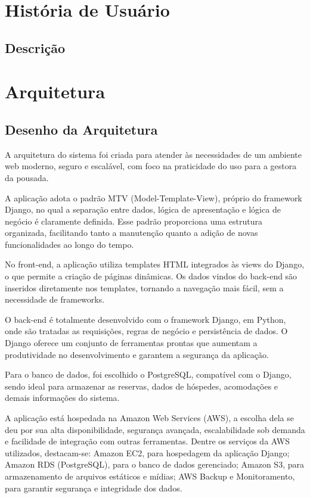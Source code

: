\documentclass[
	12pt,				%
	openany,			%
	twoside,			%
	a4paper,			%
	english,			%
	french,				%
	spanish,			%
	brazil				%
	]{abntex2}
\begin{document}
\section{História de Usuário}
\subsection{Descrição}

\section{Arquitetura}
\subsection{Desenho da Arquitetura}
A arquitetura do sistema foi criada para atender às necessidades de um ambiente web moderno, seguro e escalável, com foco na praticidade do uso para a gestora da pousada.

A aplicação adota o padrão MTV (Model-Template-View), próprio do framework Django, no qual a separação entre dados, lógica de apresentação e lógica de negócio é claramente definida. Esse padrão proporciona uma estrutura organizada, facilitando tanto a manutenção quanto a adição de novas funcionalidades ao longo do tempo.

No front-end, a aplicação utiliza templates HTML integrados às views do Django, o que permite a criação de páginas dinâmicas. Os dados vindos do back-end são inseridos diretamente nos templates, tornando a navegação mais fácil, sem a necessidade de frameworks.

O back-end é totalmente desenvolvido com o framework Django, em Python, onde são tratadas as requisições, regras de negócio e persistência de dados. O Django oferece um conjunto de ferramentas prontas que aumentam a produtividade no desenvolvimento e garantem a segurança da aplicação.

Para o banco de dados, foi escolhido o PostgreSQL, compatível com o Django, sendo ideal para armazenar as reservas, dados de hóspedes, acomodações e demais informações do sistema.

A aplicação está hospedada na Amazon Web Services (AWS), a escolha dela se deu por sua alta disponibilidade, segurança avançada, escalabilidade sob demanda e facilidade de integração com outras ferramentas. Dentre os serviços da AWS utilizados, destacam-se:
Amazon EC2, para hospedagem da aplicação Django;
Amazon RDS (PostgreSQL), para o banco de dados gerenciado;
Amazon S3, para armazenamento de arquivos estáticos e mídias;
AWS Backup e Monitoramento, para garantir segurança e integridade dos dados.
\end{document}
